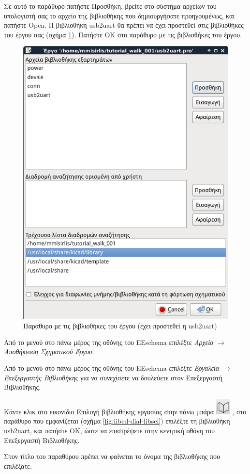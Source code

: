 \documentclass[a4paper]{article}
\begin{document}
Σε αυτό το παράθυρο πατήστε Προσθήκη, βρείτε στο σύστημα αρχείων του υπολογιστή σας το αρχείο της βιβλιοθήκης που δημιουργήσατε προηγουμένως, και πατήστε Open. Η βιβλιοθήκη usb2uart θα πρέπει να έχει προστεθεί στις βιβλιοθήκες του έργου σας (σχήμα \ref{fig:libed-dial-libs}). Πατήστε ΟΚ στο παράθυρο με τις βιβλιοθήκες του έργου.

\begin{figure}
  \begin{center}
    \includegraphics[width=.5\textwidth]{img/libed-dial-libs.png}
    \caption{Παράθυρο με τις βιβλιοθήκες του έργου (έχει προστεθεί η usb2uart)}
    \label{fig:libed-dial-libs}
  \end{center}
\end{figure}

Από το μενού στο πάνω μέρος της οθόνης του \textenglish{EEschema} επιλέξτε \textit{Αρχείο $\rightarrow$ Αποθήκευση Σχηματικού Έργου}.

Από το μενού στο πάνω μέρος της οθόνης του \textenglish{EEschema} επιλέξτε \textit{Εργαλεία $\rightarrow$ Επεξεργαστής Βιβλιοθήκης} για να συνεχίσετε να δουλεύετε στον Επεξεργαστή Βιβλιοθήκης.

Κάντε κλικ στο εικονίδιο Επιλογή βιβλιοθήκης εργασίας στην πάνω μπάρα  \includegraphics[scale=.5]{img/libed-ico-selnewlib.png}
, στο παράθυρο που εμφανίζεται (σχήμα \ref{fig:libed-dial-libsel}) επιλέξτε τη βιβλιοθήκη usb2uart, και πατήστε ΟΚ, ώστε να επιστρέψετε στην κεντρική οθόνη του Επεξεργαστή Βιβλιοθήκης. 

Στον τίτλο του παραθύρου πρέπει να φαίνεται το όνομα της βιβλιοθήκης που επιλέξατε.
\end{document}

